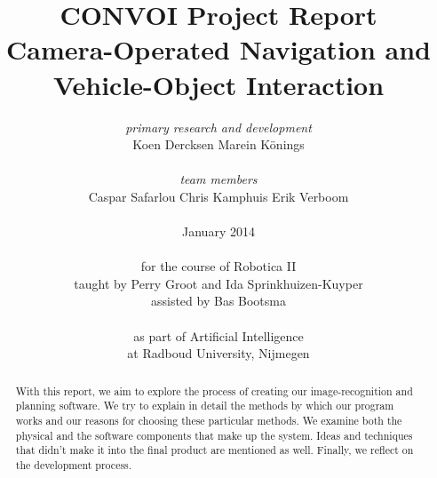 \documentclass[10pt, abstracton, twocolumn]{scrartcl}
\begin{document}
\thispagestyle{empty} %

\onecolumn

\title{CONVOI Project Report \\
\vspace{.5em}
\normalsize{Camera-Operated Navigation and Vehicle-Object Interaction} }

\author{\textit{primary research and development} \\ 
Koen Dercksen \hspace{2em} Marein K\"onings \\
\\
\textit{team members} \\
Caspar Safarlou \hspace{2em} Chris Kamphuis \hspace{2em} Erik Verboom \\
\\
January 2014 \\
\\
for the course of Robotica II \\
taught by Perry Groot and Ida Sprinkhuizen-Kuyper \\
assisted by Bas Bootsma \\
\\
as part of Artificial Intelligence \\
at Radboud University, Nijmegen
}

\onecolumn

\maketitle

\thispagestyle{empty} %

\begin{center}
\begin{minipage}{35em}

\begin{abstract}
With this report, we aim to explore the process of creating our image-recognition and planning software. We try to explain in detail the methods by which our program works and our reasons for choosing these particular methods. We examine both the physical and the software components that make up the system. Ideas and techniques that didn't make it into the final product are mentioned as well. Finally, we reflect on the development process.
\end{abstract}

\end{minipage}
\end{center}
\end{document}
